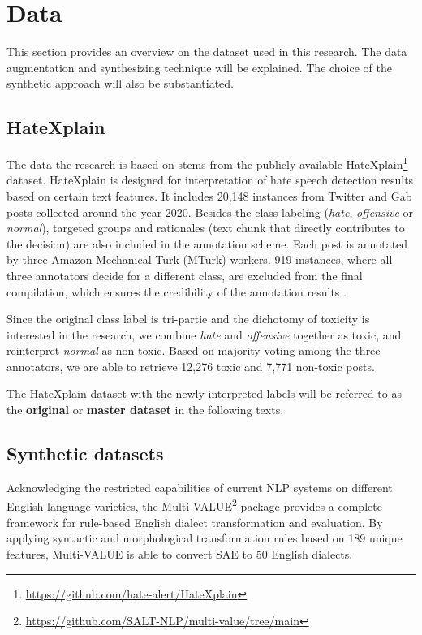 \documentclass[11pt]{article}
\begin{document}
\section{Data}

This section provides an overview on the dataset used in this research. The data augmentation and synthesizing technique will be explained. The choice of the synthetic approach will also be substantiated.

\subsection{HateXplain} \label{hatexplain-data}

The data the research is based on stems from the publicly available HateXplain\footnote{\url{https://github.com/hate-alert/HateXplain}} dataset. HateXplain is designed for interpretation of hate speech detection results based on certain text features. It includes 20,148 instances from Twitter and Gab posts collected around the year 2020. Besides the class labeling (\textit{hate}, \textit{offensive} or \textit{normal}), targeted groups and rationales (text chunk that directly contributes to the decision) are also included in the annotation scheme. Each post is annotated by three Amazon Mechanical Turk (MTurk) workers. 919 instances, where all three annotators decide for a different class, are excluded from the final compilation, which ensures the credibility of the annotation results \citep{mathew-2021-hatexplain}.

Since the original class label is tri-partie and the dichotomy of toxicity is interested in the research, we combine \textit{hate} and \textit{offensive} together as toxic, and reinterpret \textit{normal} as non-toxic. Based on majority voting among the three annotators, we are able to retrieve 12,276 toxic and 7,771 non-toxic posts.

The HateXplain dataset with the newly interpreted labels will be referred to as the \textbf{original} or \textbf{master dataset} in the following texts.

\subsection{Synthetic datasets}

Acknowledging the restricted capabilities of current NLP systems on different English language varieties, the Multi-VALUE\footnote{\url{https://github.com/SALT-NLP/multi-value/tree/main}} package \citep{ziems-2023-multi} provides a complete framework for rule-based English dialect transformation and evaluation. By applying syntactic and morphological transformation rules based on 189 unique features, Multi-VALUE is able to convert SAE to 50 English dialects.
\end{document}
